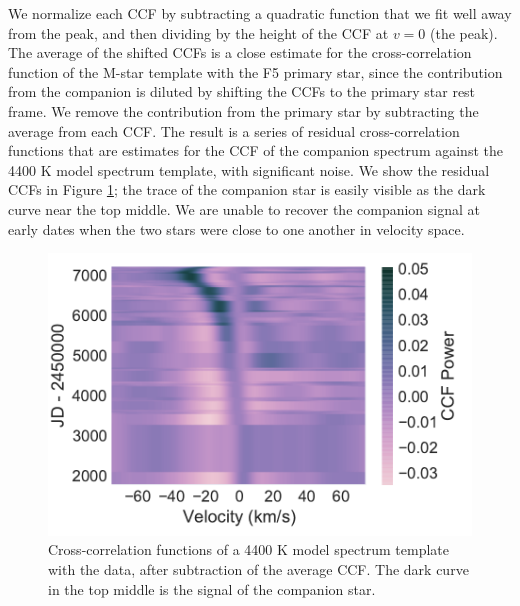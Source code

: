 \documentclass[twocolumn]{emulateapj}
\begin{document}
We normalize each CCF by subtracting a quadratic function that we fit well away from the peak, and then dividing by the height of the CCF at $v=0$ (the peak). The average of the shifted CCFs is a close estimate for the cross-correlation function of the M-star template with the F5 primary star, since the contribution from the companion is diluted by shifting the CCFs to the primary star rest frame. We remove the contribution from the primary star by subtracting the average from each CCF. The result is a series of residual cross-correlation functions that are estimates for the CCF of the companion spectrum against the 4400 K model spectrum template, with significant noise. We show the residual CCFs in Figure \ref{fig:resids}; the trace of the companion star is easily visible as the dark curve near the top middle. We are unable to recover the companion signal at early dates when the two stars were close to one another in velocity space.



\begin{figure}
  \centering
  \includegraphics[width=\columnwidth]{Resid_CCFs.pdf}
  \caption{Cross-correlation functions of a 4400 K model spectrum template with the data, after subtraction of the average CCF. The dark curve in the top middle is the signal of the companion star.}
  \label{fig:resids}
\end{figure}
\end{document}
